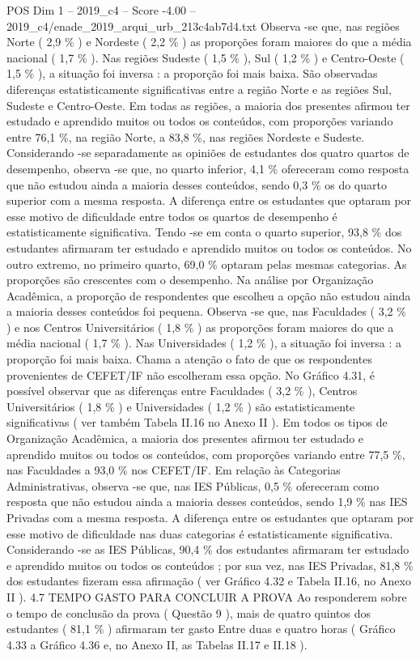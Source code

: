\begin{textsample}{POS Dim 1 – 2019\_c4 – Score -4.00 – 2019\_c4/enade\_2019\_arqui\_urb\_213c4ab7d4.txt}
Observa -se que, nas regiões Norte ( 2,9 \% ) e Nordeste ( 2,2 \% ) as proporções foram maiores do que a média nacional ( 1,7 \% ).
Nas regiões Sudeste ( 1,5 \% ), Sul ( 1,2 \% ) e Centro-Oeste ( 1,5 \% ), a situação foi inversa : a proporção foi mais baixa.
São observadas diferenças estatisticamente significativas entre a região Norte e as regiões Sul, Sudeste e Centro-Oeste.
Em todas as regiões, a maioria dos presentes afirmou ter estudado e aprendido muitos ou todos os conteúdos, com proporções variando entre 76,1 \%, na região Norte, a 83,8 \%, nas regiões Nordeste e Sudeste.
Considerando -se separadamente as opiniões de estudantes dos quatro quartos de desempenho, observa -se que, no quarto inferior, 4,1 \% ofereceram como resposta que não estudou ainda a maioria desses conteúdos, sendo 0,3 \% os do quarto superior com a mesma resposta.
A diferença entre os estudantes que optaram por esse motivo de dificuldade entre todos os quartos de desempenho é estatisticamente significativa.
Tendo -se em conta o quarto superior, 93,8 \% dos estudantes afirmaram ter estudado e aprendido muitos ou todos os conteúdos.
No outro extremo, no primeiro quarto, 69,0 \% optaram pelas mesmas categorias.
As proporções são crescentes com o desempenho.
Na análise por Organização Acadêmica, a proporção de respondentes que escolheu a opção não estudou ainda a maioria desses conteúdos foi pequena.
Observa -se que, nas Faculdades ( 3,2 \% ) e nos Centros Universitários ( 1,8 \% ) as proporções foram maiores do que a média nacional ( 1,7 \% ).
Nas Universidades ( 1,2 \% ), a situação foi inversa : a proporção foi mais baixa.
Chama a atenção o fato de que os respondentes provenientes de CEFET/IF não escolheram essa opção.
No Gráfico 4.31, é possível observar que as diferenças entre Faculdades ( 3,2 \% ), Centros Universitários ( 1,8 \% ) e Universidades ( 1,2 \% ) são estatisticamente significativas ( ver também Tabela II.16 no Anexo II ).
Em todos os tipos de Organização Acadêmica, a maioria dos presentes afirmou ter estudado e aprendido muitos ou todos os conteúdos, com proporções variando entre 77,5 \%, nas Faculdades a 93,0 \% nos CEFET/IF.
Em relação às Categorias Administrativas, observa -se que, nas IES Públicas, 0,5 \% ofereceram como resposta que não estudou ainda a maioria desses conteúdos, sendo 1,9 \% nas IES Privadas com a mesma resposta.
A diferença entre os estudantes que optaram por esse motivo de dificuldade nas duas categorias é estatisticamente significativa.
Considerando -se as IES Públicas, 90,4 \% dos estudantes afirmaram ter estudado e aprendido muitos ou todos os conteúdos ; por sua vez, nas IES Privadas, 81,8 \% dos estudantes fizeram essa afirmação ( ver Gráfico 4.32 e Tabela II.16, no Anexo II ). 4.7 TEMPO GASTO PARA CONCLUIR A PROVA Ao responderem sobre o tempo de conclusão da prova ( Questão 9 ), mais de quatro quintos dos estudantes ( 81,1 \% ) afirmaram ter gasto Entre duas e quatro horas ( Gráfico 4.33 a Gráfico 4.36 e, no Anexo II, as Tabelas II.17 e II.18 ).

\end{textsample}
